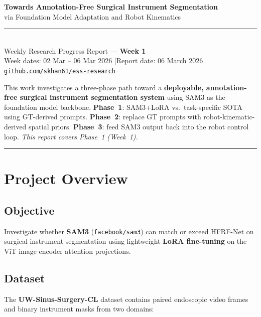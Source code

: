 \documentclass[11pt, a4paper]{article}
\begin{document}
\begin{center}
    {\LARGE \textbf{Towards Annotation-Free Surgical Instrument Segmentation}}\\[0.3em]
    {\large via Foundation Model Adaptation and Robot Kinematics}\\[0.5em]
    \rule{0.5\linewidth}{0.4pt}\\[0.4em]
    {\normalsize Weekly Research Progress Report --- \textbf{Week 1}}\\[0.3em]
    {\normalsize Week dates: 02 Mar -- 06 Mar 2026 \quad|\quad Report date: 06 March 2026}\\[0.3em]
    {\normalsize \href{https://github.com/skhan61/ess-research}{\texttt{github.com/skhan61/ess-research}}}
\end{center}
\vspace{0.5em}

\noindent This work investigates a three-phase path toward a \textbf{deployable,
annotation-free surgical instrument segmentation system} using SAM3 as the foundation
model backbone. \textbf{Phase~1}: SAM3+LoRA vs.\ task-specific SOTA using GT-derived
prompts. \textbf{Phase~2}: replace GT prompts with robot-kinematic-derived spatial
priors. \textbf{Phase~3}: feed SAM3 output back into the robot control loop.
\textit{This report covers Phase~1 (Week~1).}

\hrule
\vspace{1em}

\section{Project Overview}

\subsection{Objective}
Investigate whether \textbf{SAM3} (\texttt{facebook/sam3}) can match or exceed
HFRF-Net on surgical instrument segmentation using lightweight \textbf{LoRA
fine-tuning} on the ViT image encoder attention projections.

\subsection{Dataset}
The \textbf{UW-Sinus-Surgery-CL} dataset contains paired endoscopic video frames
and binary instrument masks from two domains:
\end{document}
